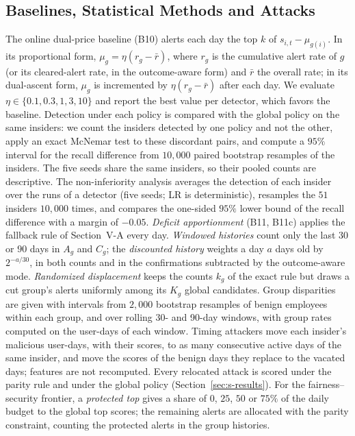 \documentclass[10pt,onecolumn,letterpaper]{article}
\begin{document}
\subsection{Baselines, Statistical Methods and Attacks}
The online dual-price baseline (B10) alerts each day the top $k$ of $s_{i,t}-\mu_{g(i)}$. In its proportional form, $\mu_g=\eta(r_g-\bar r)$, where $r_g$ is the cumulative alert rate of $g$ (or its cleared-alert rate, in the outcome-aware form) and $\bar r$ the overall rate; in its dual-ascent form, $\mu_g$ is incremented by $\eta(r_g-\bar r)$ after each day. We evaluate $\eta\in\{0.1,0.3,1,3,10\}$ and report the best value per detector, which favors the baseline. Detection under each policy is compared with the global policy on the same insiders: we count the insiders detected by one policy and not the other, apply an exact McNemar test to these discordant pairs, and compute a $95\%$ interval for the recall difference from $10{,}000$ paired bootstrap resamples of the insiders. The five seeds share the same insiders, so their pooled counts are descriptive. The non-inferiority analysis averages the detection of each insider over the runs of a detector (five seeds; LR is deterministic), resamples the $51$ insiders $10{,}000$ times, and compares the one-sided $95\%$ lower bound of the recall difference with a margin of $-0.05$. \emph{Deficit apportionment} (B11, B11c) applies the fallback rule of Section~V-A every day. \emph{Windowed histories} count only the last $30$ or $90$ days in $A_g$ and $C_g$; the \emph{discounted history} weights a day $a$ days old by $2^{-a/30}$, in both counts and in the confirmations subtracted by the outcome-aware mode. \emph{Randomized displacement} keeps the counts $k_g$ of the exact rule but draws a cut group's alerts uniformly among its $K_g$ global candidates. Group disparities are given with intervals from $2{,}000$ bootstrap resamples of benign employees within each group, and over rolling 30- and 90-day windows, with group rates computed on the user-days of each window. Timing attackers move each insider's malicious user-days, with their scores, to as many consecutive active days of the same insider, and move the scores of the benign days they replace to the vacated days; features are not recomputed. Every relocated attack is scored under the parity rule and under the global policy (Section~\ref{sec:s-results}). For the fairness--security frontier, a \emph{protected top} gives a share of $0$, $25$, $50$ or $75\%$ of the daily budget to the global top scores; the remaining alerts are allocated with the parity constraint, counting the protected alerts in the group histories.
\end{document}
